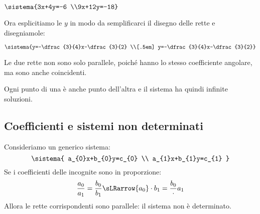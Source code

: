  \begin{esempio}{}{}
\(\sistema{3x+4y=-6 \\9x+12y=-18}\)
\vspace{1em}

Ora esplicitiamo le \(y\) in modo da semplificarci il disegno delle rette e 
disegniamole:

\begin{minipage}{.48\textwidth}
\[\sistema{y=-\dfrac{3}{4}x-\dfrac{3}{2} \\[.5em] 
           y=-\dfrac{3}{4}x-\dfrac{3}{2}}\]

Le due rette non sono solo parallele, poiché hanno lo stesso coefficiente 
angolare, ma sono anche coincidenti. 

Ogni punto di una è anche punto dell'altra e il sistema ha quindi infinite 
soluzioni.
\end{minipage}
\hfill
\begin{minipage}{.48\textwidth}
\begin{center}
\end{center}
\end{minipage}

\end{esempio}

\subsection{Coefficienti e sistemi non determinati}

Consideriamo un generico sistema:
\[\sistema{
 a_{0}x+b_{0}y=c_{0} \\
 a_{1}x+b_{1}y=c_{1} 
}\]
Se i coefficienti delle incognite sono in proporzione:
\[\frac{a_{0}}{a_{1}} = \frac{b_{0}}{b_{1}} \sLRarrow
{a_{0}} \cdot {b_{1}} = \frac{b_{0}} \cdot {a_{1}}\]
Allora le rette corrispondenti sono parallele: il sistema non è determinato.

